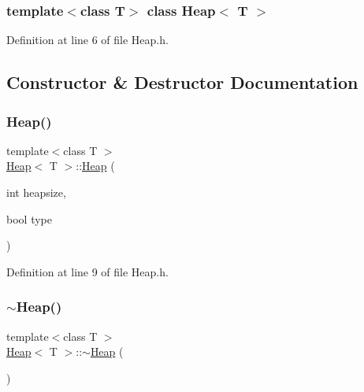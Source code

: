 \subsubsection*{template$<$class T$>$\newline
class Heap$<$ T $>$}



Definition at line 6 of file Heap.\+h.



\subsection{Constructor \& Destructor Documentation}
\mbox{\label{class_heap_ab0d9672cff1ce2a767ed5c75f2ec9b56}} 
\subsubsection{\texorpdfstring{Heap()}{Heap()}}
{\footnotesize\ttfamily template$<$class T $>$ \\
\hyperlink{class_heap}{Heap}$<$ T $>$\+::\hyperlink{class_heap}{Heap} (\begin{DoxyParamCaption}\item[{int}]{heapsize,  }\item[{bool}]{type }\end{DoxyParamCaption})\hspace{0.3cm}{\ttfamily [inline]}}



Definition at line 9 of file Heap.\+h.

\mbox{\label{class_heap_a7887eec294f679fad13d8226ba7b3a44}} 
\subsubsection{\texorpdfstring{$\sim$\+Heap()}{~Heap()}}
{\footnotesize\ttfamily template$<$class T $>$ \\
\hyperlink{class_heap}{Heap}$<$ T $>$\+::$\sim$\hyperlink{class_heap}{Heap} (\begin{DoxyParamCaption}{ }\end{DoxyParamCaption})\hspace{0.3cm}{\ttfamily [inline]}}



